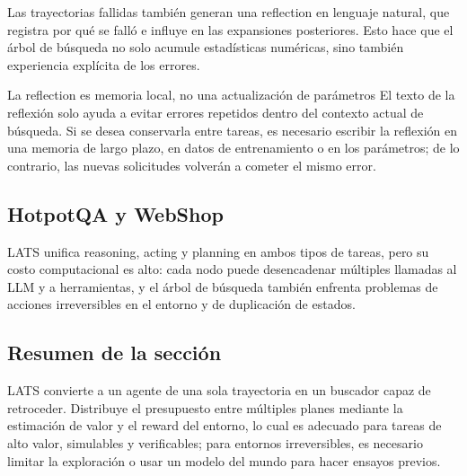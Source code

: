 

Las trayectorias fallidas también generan una reflection en lenguaje natural, que registra por qué se falló e influye en las expansiones posteriores. Esto hace que el árbol de búsqueda no solo acumule estadísticas numéricas, sino también experiencia explícita de los errores.

\begin{knowledgebox}{La reflection es memoria local, no una actualización de parámetros}
El texto de la reflexión solo ayuda a evitar errores repetidos dentro del contexto actual de búsqueda. Si se desea conservarla entre tareas, es necesario escribir la reflexión en una memoria de largo plazo, en datos de entrenamiento o en los parámetros; de lo contrario, las nuevas solicitudes volverán a cometer el mismo error.
\end{knowledgebox}

\subsection{HotpotQA y WebShop}



LATS unifica reasoning, acting y planning en ambos tipos de tareas, pero su costo computacional es alto: cada nodo puede desencadenar múltiples llamadas al LLM y a herramientas, y el árbol de búsqueda también enfrenta problemas de acciones irreversibles en el entorno y de duplicación de estados.

\subsection{Resumen de la sección}

LATS convierte a un agente de una sola trayectoria en un buscador capaz de retroceder. Distribuye el presupuesto entre múltiples planes mediante la estimación de valor y el reward del entorno, lo cual es adecuado para tareas de alto valor, simulables y verificables; para entornos irreversibles, es necesario limitar la exploración o usar un modelo del mundo para hacer ensayos previos.
